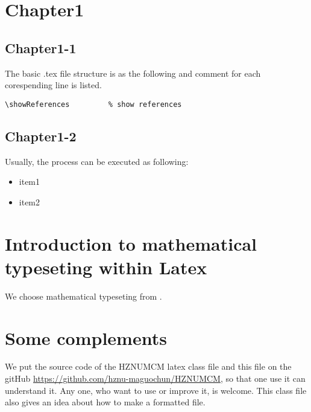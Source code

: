 \documentclass{MYZJUMCM}
\begin{document}
\showSummarySheet
\showContents %
\section{Chapter1}
\subsection{Chapter1-1}
The basic .tex file structure is as the following and comment for each corespending line is listed.

\begin{lstlisting}[style=latexstyle]
\showReferences         % show references
\end{lstlisting}

\subsection{Chapter1-2} 
Usually, the process can be executed as following:

\begin{itemize}
\item item1
\item item2
\end{itemize}


\section{Introduction to mathematical typeseting within Latex}

We choose mathematical typeseting from \cite{tobias}.



\section{Some complements}
We put the source code of the HZNUMCM latex class file and this file on the gitHub \url{https://github.com/hznu-maguochun/HZNUMCM}, so that one use it can understand it. Any one, who want to use or improve it, is welcome. This class file also gives an idea about how to make a formatted file.

\showReferences

%
\end{document}
